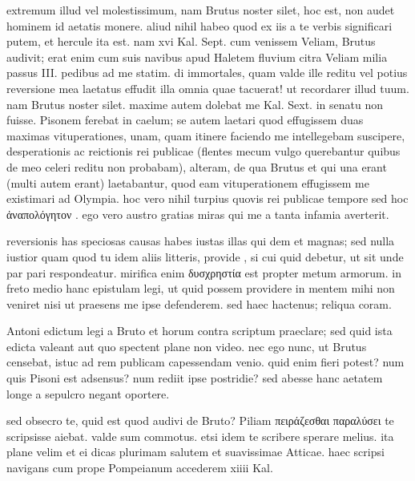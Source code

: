  extremum illud vel molestissimum, nam Brutus noster silet, hoc est, non audet hominem id aetatis monere. aliud nihil habeo quod ex iis a te verbis significari putem, et hercule ita est. nam xvi Kal. Sept. cum venissem Veliam, Brutus audivit; erat enim cum suis navibus apud Haletem fluvium citra Veliam milia passus III. pedibus ad me statim. di immortales, quam valde ille reditu vel potius reversione mea laetatus effudit illa omnia quae tacuerat! ut recordarer illud tuum. nam Brutus noster silet. maxime autem dolebat me Kal. Sext. in senatu non fuisse. Pisonem ferebat in caelum; se autem laetari quod effugissem duas maximas vituperationes, unam, quam itinere faciendo me intellegebam suscipere, desperationis ac reictionis rei publicae (flentes mecum vulgo querebantur quibus de meo celeri reditu non probabam), alteram, de qua Brutus et qui una erant (multi autem erant) laetabantur, quod eam vituperationem effugissem me existimari ad Olympia. hoc vero nihil turpius quovis rei publicae tempore sed hoc ἀναπολόγητον . ego vero austro gratias miras qui me a tanta infamia averterit.

 reversionis has speciosas causas habes iustas illas qui dem et magnas; sed nulla iustior quam quod tu idem aliis litteris, provide , si cui quid debetur, ut sit unde par pari respondeatur. mirifica enim δυσχρηστία est propter metum armorum. in freto medio hanc epistulam legi, ut quid possem providere in mentem mihi non veniret nisi ut praesens me ipse defenderem. sed haec hactenus; reliqua coram.

 Antoni edictum legi a Bruto et horum contra scriptum praeclare; sed quid ista edicta valeant aut quo spectent plane non video. nec ego nunc, ut Brutus censebat, istuc ad rem publicam capessendam venio. quid enim fieri potest? num quis Pisoni est adsensus? num rediit ipse postridie? sed abesse hanc aetatem longe a sepulcro negant oportere.

 sed obsecro te, quid est quod audivi de Bruto? Piliam πειράζεσθαι παραλύσει te scripsisse aiebat. valde sum commotus. etsi idem te scribere sperare melius. ita plane velim et ei dicas plurimam salutem et suavissimae Atticae. haec scripsi navigans cum prope Pompeianum accederem xiiii Kal.
